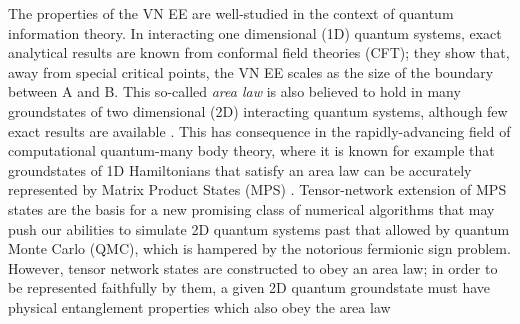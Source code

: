 \documentclass[prl,aps,twocolumn,floatfix,amsmath,amssymb,superscriptaddress,tightenlines]{revtex4}
\begin{document}
The properties of the VN EE are well-studied in the context of quantum information theory.
In interacting one dimensional (1D) quantum systems, exact analytical results are known from conformal
field theories (CFT); they show that, away from special critical points,
the VN EE scales as the size of the boundary between A and B.
This so-called {\it area law} \cite{Shredder} is also believed to hold in many
groundstates of two dimensional (2D) interacting quantum systems,
although few exact results are available \cite{ALreview}.  This has 
consequence in the
rapidly-advancing field of computational quantum-many body theory, where
it is known for example that groundstates of 1D Hamiltonians that satisfy an area law
can be accurately represented by Matrix Product States (MPS) \cite{MPS_DMRG}.
Tensor-network extension of MPS states are the basis
for a new promising class of numerical algorithms \cite{PEPS1,PEPS2} that may push our
abilities to simulate 2D quantum systems past that
allowed by quantum Monte Carlo (QMC), which is hampered by
the notorious fermionic sign problem.  However, tensor network states
are constructed to obey an area law; in order to be represented faithfully
by them, a given 2D quantum groundstate must have physical entanglement
properties which also obey the area law \cite{ALreview}


\end{document}
